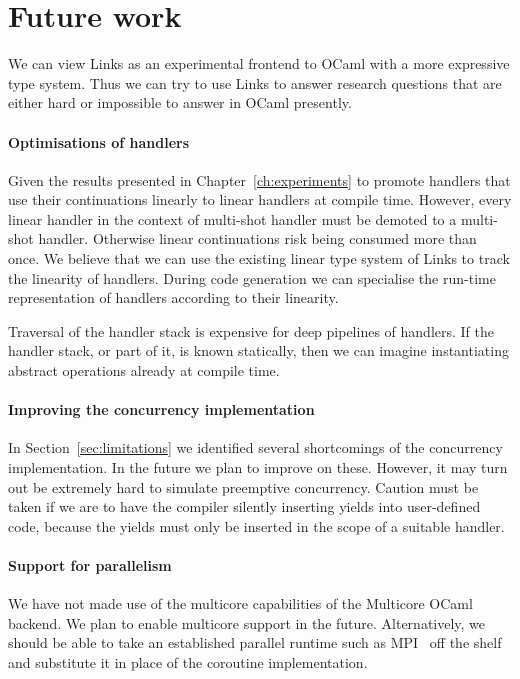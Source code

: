 \documentclass[12pt,mscres,cdtppar,twoside,openright,logo,rightchapter,normalheadings]{infthesis}
\theoremstyle{definition}
\begin{document}
\section{Future work}
\label{sec:futurework}

We can view Links as an experimental frontend to OCaml with a more
expressive type system. Thus we can try to use Links to answer
research questions that are either hard or impossible to answer in
OCaml presently.

\paragraph{Optimisations of handlers} 
Given the results presented in Chapter~\ref{ch:experiments} to promote
handlers that use their continuations linearly to linear handlers at
compile time. However, every linear handler in the context of
multi-shot handler must be demoted to a multi-shot handler. Otherwise
linear continuations risk being consumed more than once. We believe
that we can use the existing linear type system of Links to track the
linearity of handlers. During code generation we can specialise the
run-time representation of handlers according to their linearity.

Traversal of the handler stack is expensive for deep pipelines of
handlers. If the handler stack, or part of it, is known statically,
then we can imagine instantiating abstract operations already at
compile time.

\paragraph{Improving the concurrency implementation}
In Section~\ref{sec:limitations} we identified several shortcomings of
the concurrency implementation. In the future we plan to improve on
these. However, it may turn out be extremely hard to simulate
preemptive concurrency. Caution must be taken if we are to have the
compiler silently inserting yields into user-defined code, because the
yields must only be inserted in the scope of a suitable handler.


\paragraph{Support for parallelism}
We have not made use of the multicore capabilities of the Multicore
OCaml backend. We plan to enable multicore support in the
future. Alternatively, we should be able to take an established
parallel runtime such as MPI~\citep{Mpi2012} off the shelf and
substitute it in place of the coroutine implementation.
\end{document}

